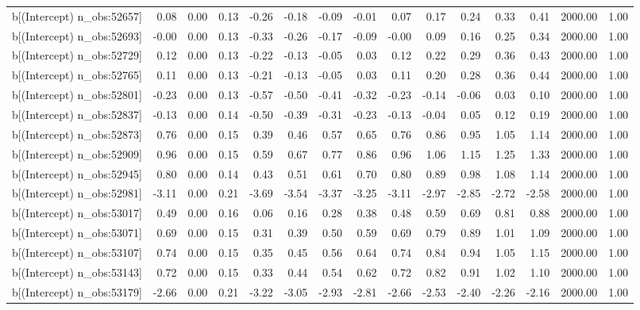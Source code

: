 \begin{table}[ht]
\begin{tabular}{rrrrrrrrrrrrrrr}
  b[(Intercept) n\_obs:52657] & 0.08 & 0.00 & 0.13 & -0.26 & -0.18 & -0.09 & -0.01 & 0.07 & 0.17 & 0.24 & 0.33 & 0.41 & 2000.00 & 1.00 \\ 
  b[(Intercept) n\_obs:52693] & -0.00 & 0.00 & 0.13 & -0.33 & -0.26 & -0.17 & -0.09 & -0.00 & 0.09 & 0.16 & 0.25 & 0.34 & 2000.00 & 1.00 \\ 
  b[(Intercept) n\_obs:52729] & 0.12 & 0.00 & 0.13 & -0.22 & -0.13 & -0.05 & 0.03 & 0.12 & 0.22 & 0.29 & 0.36 & 0.43 & 2000.00 & 1.00 \\ 
  b[(Intercept) n\_obs:52765] & 0.11 & 0.00 & 0.13 & -0.21 & -0.13 & -0.05 & 0.03 & 0.11 & 0.20 & 0.28 & 0.36 & 0.44 & 2000.00 & 1.00 \\ 
  b[(Intercept) n\_obs:52801] & -0.23 & 0.00 & 0.13 & -0.57 & -0.50 & -0.41 & -0.32 & -0.23 & -0.14 & -0.06 & 0.03 & 0.10 & 2000.00 & 1.00 \\ 
  b[(Intercept) n\_obs:52837] & -0.13 & 0.00 & 0.14 & -0.50 & -0.39 & -0.31 & -0.23 & -0.13 & -0.04 & 0.05 & 0.12 & 0.19 & 2000.00 & 1.00 \\ 
  b[(Intercept) n\_obs:52873] & 0.76 & 0.00 & 0.15 & 0.39 & 0.46 & 0.57 & 0.65 & 0.76 & 0.86 & 0.95 & 1.05 & 1.14 & 2000.00 & 1.00 \\ 
  b[(Intercept) n\_obs:52909] & 0.96 & 0.00 & 0.15 & 0.59 & 0.67 & 0.77 & 0.86 & 0.96 & 1.06 & 1.15 & 1.25 & 1.33 & 2000.00 & 1.00 \\ 
  b[(Intercept) n\_obs:52945] & 0.80 & 0.00 & 0.14 & 0.43 & 0.51 & 0.61 & 0.70 & 0.80 & 0.89 & 0.98 & 1.08 & 1.14 & 2000.00 & 1.00 \\ 
  b[(Intercept) n\_obs:52981] & -3.11 & 0.00 & 0.21 & -3.69 & -3.54 & -3.37 & -3.25 & -3.11 & -2.97 & -2.85 & -2.72 & -2.58 & 2000.00 & 1.00 \\ 
  b[(Intercept) n\_obs:53017] & 0.49 & 0.00 & 0.16 & 0.06 & 0.16 & 0.28 & 0.38 & 0.48 & 0.59 & 0.69 & 0.81 & 0.88 & 2000.00 & 1.00 \\ 
  b[(Intercept) n\_obs:53071] & 0.69 & 0.00 & 0.15 & 0.31 & 0.39 & 0.50 & 0.59 & 0.69 & 0.79 & 0.89 & 1.01 & 1.09 & 2000.00 & 1.00 \\ 
  b[(Intercept) n\_obs:53107] & 0.74 & 0.00 & 0.15 & 0.35 & 0.45 & 0.56 & 0.64 & 0.74 & 0.84 & 0.94 & 1.05 & 1.15 & 2000.00 & 1.00 \\ 
  b[(Intercept) n\_obs:53143] & 0.72 & 0.00 & 0.15 & 0.33 & 0.44 & 0.54 & 0.62 & 0.72 & 0.82 & 0.91 & 1.02 & 1.10 & 2000.00 & 1.00 \\ 
  b[(Intercept) n\_obs:53179] & -2.66 & 0.00 & 0.21 & -3.22 & -3.05 & -2.93 & -2.81 & -2.66 & -2.53 & -2.40 & -2.26 & -2.16 & 2000.00 & 1.00 \\ 

\end{tabular}
\end{table}
